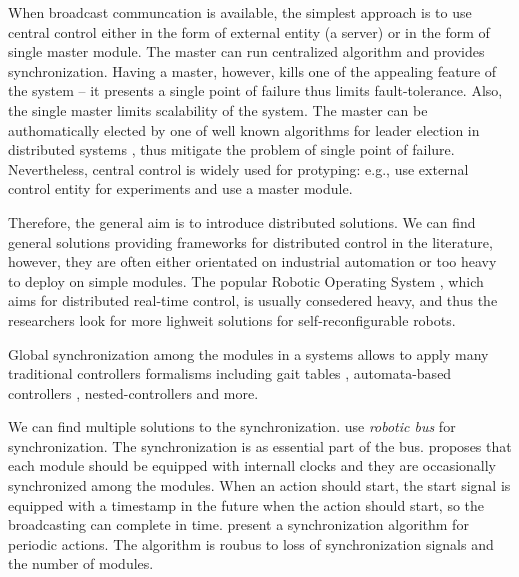 \bigskip

When broadcast communcation is available, the simplest approach is to use
central control either in the form of external entity (a server) or in the form
of single master module. The master can run centralized algorithm and provides
synchronization. Having a master, however, kills one of the appealing feature of
the system -- it presents a single point of failure thus limits fault-tolerance.
Also, the single master limits scalability of the system. The master can be
authomatically elected by one of well known algorithms for leader election in
distributed systems \cite{baca2016coordination}, thus mitigate the problem of
single point of failure. Nevertheless, central control is widely used for
protyping: e.g., \cite{DBLP:journals/ijrr/KurokawaTKKHM08,
DBLP:conf/icra/TosunDJKCY18} use external control entity for experiments and
\cite{superbotroller} use a master module.

Therefore, the general aim is to introduce distributed solutions. We can find
general solutions providing frameworks for distributed control in the
literature, however, they are often either orientated on industrial automation
or too heavy to deploy on simple modules. The popular Robotic Operating System
\cite{DBLP:journals/corr/abs-1809-02595}, which aims for distributed real-time
control, is usually consedered heavy, and thus the researchers look for more
lighweit solutions for self-reconfigurable robots.

Global synchronization among the modules in a systems allows to apply many
traditional controllers formalisms including gait tables
\cite{DBLP:conf/icarcv/KurokawaKYTMK02, DBLP:conf/iros/YimSSPDT07a},
automata-based controllers \cite{DBLP:journals/procedia/PouyaAMI11,
DBLP:journals/arobots/JingTYK18}, nested-controllers \cite{1159219} and more.

We can find multiple solutions to the synchronization.
\textcite{DBLP:journals/ijrr/ParkCTY08} use \emph{robotic bus} \cite{roboticbus}
for synchronization. The synchronization is as essential part of the bus.
\textcite{yim1994locomotion} proposes that each module should be equipped with
internall clocks and they are occasionally synchronized among the modules. When
an action should start, the start signal is equipped with a timestamp in the
future when the action should start, so the broadcasting can complete in time.
\textcite{stoy2002global} present a synchronization algorithm for periodic
actions. The algorithm is roubus to loss of synchronization signals and the
number of modules.

